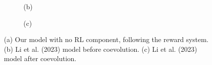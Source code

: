 \documentclass[9pt]{pnas-new}
\begin{document}
\begin{figure}[ht]
\begin{subfigure}{0.30\textwidth}
		\vspace{0.5em}
		\centering (b)
	\end{subfigure}
	\hfill
	\begin{subfigure}{0.30\textwidth}
		\centering
		\vspace{0.5em}
		\centering (c)
	\end{subfigure}
	
	\caption{(a) Our model with no RL component, following the reward system. (b) Li et al. (2023) model before coevolution. (c) Li et al. (2023) model after coevolution. }
	\label{fig:three_images}
\end{figure}
\end{document}
